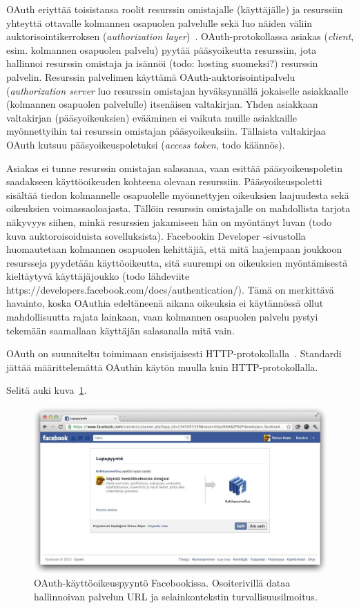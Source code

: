 \documentclass[finnish,gradu]{tktltiki}
\begin{document}
  OAuth eriyttää toisistansa roolit resurssin omistajalle (käyttäjälle) ja resurssiin yhteyttä ottavalle kolmannen osapuolen palvelulle sekä luo näiden väliin auktorisointikerroksen (\emph{authorization layer})~\cite{ietf_oauth2}. OAuth-protokollassa asiakas (\emph{client}, esim. kolmannen osapuolen palvelu) pyytää pääsyoikeutta resurssiin, jota hallinnoi resurssin omistaja ja isännöi (todo: hosting suomeksi?) resurssin palvelin. Resurssin palvelimen käyttämä OAuth-auktorisointipalvelu (\emph{authorization server} luo resurssin omistajan hyväksynnällä jokaiselle asiakkaalle (kolmannen osapuolen palvelulle) itsenäisen valtakirjan. Yhden asiakkaan valtakirjan (pääsyoikeuksien) evääminen ei vaikuta muille asiakkaille myönnettyihin tai resurssin omistajan pääsyoikeuksiin. Tällaista valtakirjaa OAuth kutsuu pääsyoikeuspoletuksi (\emph{access token}, todo käännös).

  Asiakas ei tunne resurssin omistajan salasanaa, vaan esittää pääsyoikeuspoletin saadakseen käyttöoikeuden kohteena olevaan resurssiin. Pääsyoikeuspoletti sisältää tiedon kolmannelle osapuolelle myönnettyjen oikeuksien laajuudesta sekä oikeuksien voimassaoloajasta. Tällöin resurssin omistajalle on mahdollista tarjota näkyvyys siihen, minkä resurssien jakamiseen hän on myöntänyt luvan (todo kuva auktoroisoiduista sovelluksista). Facebookin Developer -sivustolla huomautetaan kolmannen osapuolen kehittäjiä, että mitä laajempaan joukkoon resursseja pyydetään käyttöoikeutta, sitä suurempi on oikeuksien myöntämisestä kieltäytyvä käyttäjäjoukko (todo lähdeviite https://developers.facebook.com/docs/authentication/). Tämä on merkittävä havainto, koska OAuthia edeltäneenä aikana oikeuksia ei käytännössä ollut mahdollisuutta rajata lainkaan, vaan kolmannen osapuolen palvelu pystyi tekemään saamallaan käyttäjän salasanalla mitä vain.

  OAuth on suunniteltu toimimaan ensisijaisesti HTTP-protokollalla~\cite{ietf_oauth2}.
  Standardi jättää määrittelemättä OAuthin käytön muulla kuin HTTP-protokollalla.


  Selitä auki kuva~\ref{fig:facebook_oauth_lupapyynto}.

  \begin{figure}
    \centering
    \includegraphics[width=1.0\textwidth]{images/facebook_oauth_lupapyynto.jpg}
    \caption{OAuth-käyttöoikeuspyyntö Facebookissa. Osoiterivillä dataa hallinnoivan palvelun URL ja selainkontekstin turvallisuusilmoitus.}
    \label{fig:facebook_oauth_lupapyynto}
  \end{figure}
\end{document}

